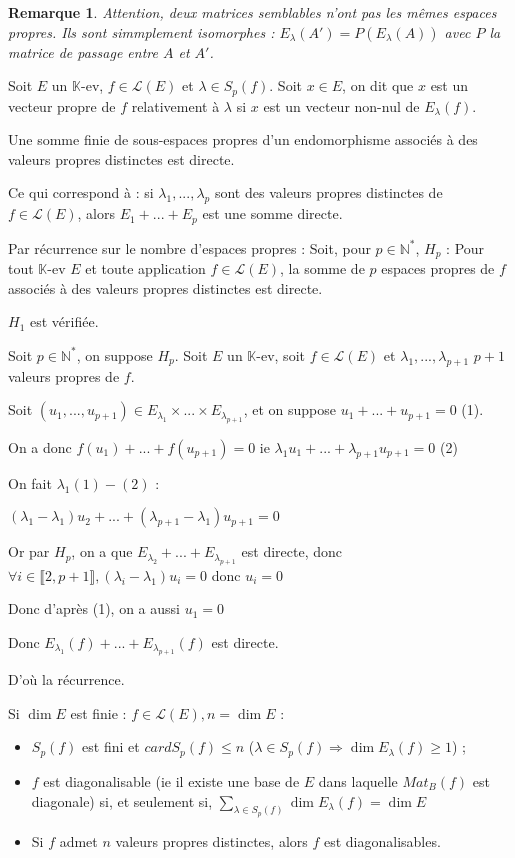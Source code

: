 \documentclass[a4paper,12pt]{book}
\newcommand{\Def}[2]{\begin{tcolorbox}[sharp corners, colback=white,colframe=blue!90!black!75, title=Définition : #1]#2\end{tcolorbox}}
\newcommand{\Thr}[2]{\begin{tcolorbox}[sharp corners, colback=white,colframe=red!90!black!75, title=Théorème : #1]#2\end{tcolorbox}}
\newcommand{\Prop}[2]{\begin{tcolorbox}[sharp corners, colback=white,colframe=red!90!black!75, title=Proposition : #1]#2\end{tcolorbox}}
\newcommand{\Pre}[1]{\begin{tcolorbox}[sharp corners, colback=white,colframe=green!60!green!30!black!75, title=Preuve]#1\end{tcolorbox}}
\newtheorem{Rem}{Remarque}[section]
\def\N{\mathbb{N}}
\def\K{\mathbb{K}}
\begin{document}
\begin{Rem}
Attention, deux matrices semblables n'ont pas les mêmes espaces propres. Ils sont simmplement isomorphes : $E_\lambda(A')=P(E_\lambda(A))$ avec $P$ la matrice de passage entre $A$ et $A'$.
\end{Rem}
\Def{Vecteur propre}{Soit $E$ un $\K$-ev, $f\in\mathcal{L}(E)$ et $\lambda\in S_p(f)$. Soit $x\in E$, on dit que $x$ est un vecteur propre de $f$ relativement à $\lambda$ si $x$ est un vecteur non-nul de $E_\lambda(f)$.}
\Thr{}{Une somme finie de sous-espaces propres d'un endomorphisme associés à des valeurs propres distinctes est directe.\par Ce qui correspond à : si $\lambda_1,...,\lambda_p$ sont des valeurs propres distinctes de $f\in\mathcal{L}(E)$, alors $E_1+...+E_p$ est une somme directe.}
\Pre{Par récurrence sur le nombre d'espaces propres : Soit, pour $p\in \N^*$, $H_p$ : Pour tout $\K$-ev $E$ et toute application $f\in\mathcal{L}(E)$, la somme de $p$ espaces propres de $f$ associés à des valeurs propres distinctes est directe.
\par $H_1$ est vérifiée. \par Soit $p\in\N^*$, on suppose $H_p$. Soit $E$ un $\K$-ev, soit $f\in\mathcal{L}(E)$ et $\lambda_1,...,\lambda_{p+1}$ $p+1$ valeurs propres de $f$. \par Soit $(u_1,..., u_{p+1})\in E_{\lambda_1}\times...\times E_{\lambda_{p+1}}$, et on suppose $u_1+...+u_{p+1}=0$ (1). \par On a donc $f(u_1)+...+f(u_{p+1})=0$ ie $\lambda_1 u_1 +...+\lambda_{p+1}u_{p+1}=0$ (2) \par On fait $\lambda_1(1)-(2)$ : \par $(\lambda_1-\lambda_1)u_2 +...+(\lambda_{p+1}-\lambda_1)u_{p+1}=0$
\par Or par $H_p$, on a que $E_{\lambda_2}+...+E_{\lambda_{p+1}}$ est directe, donc $\forall i\in\llbracket2,p+1\rrbracket, (\lambda_i-\lambda_1)u_i=0$ donc $u_i=0$ \par Donc d'après (1), on a aussi $u_1=0$ \par Donc $E_{\lambda_1}(f)+...+E_{\lambda_{p+1}}(f)$ est directe. \par D'où la récurrence.}
\Prop{Corollaire}{Si $\dim E$ est finie : $f\in\mathcal{L}(E), n=\dim E$ :\begin{itemize}
\item $S_p(f)$ est fini et $card S_p(f)\leq n$ ($\lambda \in S_p(f)\Rightarrow \dim E_\lambda(f)\geq 1$) ;
\item $f$ est diagonalisable (ie il existe une base de $E$ dans laquelle $Mat_B(f)$ est diagonale) si, et seulement si, $\sum\limits_{\lambda\in S_p(f)}\dim E_\lambda(f)=\dim E$
\item Si $f$ admet $n$ valeurs propres distinctes, alors $f$ est diagonalisables.
\end{itemize}}
\end{document}
